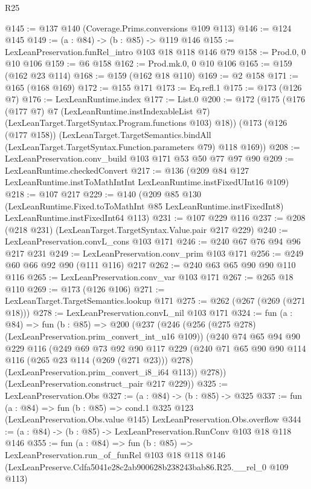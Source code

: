 \begin{lexlean}{R25}
\begin{coremodule}
@145 := @137 @140 (Coverage.Prims.conversions @109 @113)
@146 := @124 @145
@149 := (a : @84) -> (b : @85) -> @119 @146
@155 := LexLeanPreservation.funRel_intro @103 @18 @118 @146 @79
@158 := Prod.{0, 0} @10 @106
@159 := @6 @158
@162 := Prod.mk.{0, 0} @10 @106
@165 := @159 (@162 @23 @114)
@168 := @159 (@162 @18 @110)
@169 := @2 @158
@171 := @165 (@168 @169)
@172 := @155 @171
@173 := Eq.refl.{1}
@175 := @173 (@126 @7)
@176 := LexLeanRuntime.index
@177 := List.{0}
@200 := @172
    (@175
      (@176
        (@177 @7)
        @7
        (LexLeanRuntime.instIndexableList @7)
        (LexLeanTarget.TargetSyntax.Program.functions @103)
        @18))
    (@173
      (@126 (@177 @158))
      (LexLeanTarget.TargetSemantics.bindAll
        (LexLeanTarget.TargetSyntax.Function.parameters @79)
        @118
        @169))
@208 := LexLeanPreservation.conv_build @103 @171 @53 @50 @77 @97 @90
@209 := LexLeanRuntime.checkedConvert
@217 := @136 (@209 @84 @127 LexLeanRuntime.instToMathIntInt LexLeanRuntime.instFixedUInt16 @109)
@218 := @107 @217
@229 := @140
    (@209
      @85
      @130
      (LexLeanRuntime.Fixed.toToMathInt @85 LexLeanRuntime.instFixedInt8)
      LexLeanRuntime.instFixedInt64
      @113)
@231 := @107 @229 @116
@237 := @208 (@218 @231) (LexLeanTarget.TargetSyntax.Value.pair @217 @229)
@240 := LexLeanPreservation.convL_cons @103 @171
@246 := @240 @67 @76 @94 @96 @217 @231
@249 := LexLeanPreservation.conv_prim @103 @171
@256 := @249 @60 @66 @92 @90 (@111 @116) @217
@262 := @240 @63 @65 @90 @90 @110 @116
@265 := LexLeanPreservation.conv_var @103 @171
@267 := @265 @18 @110
@269 := @173 (@126 @106)
@271 := LexLeanTarget.TargetSemantics.lookup @171
@275 := @262 (@267 (@269 (@271 @18)))
@278 := LexLeanPreservation.convL_nil @103 @171
@324 := fun (a : @84) =>
  fun (b : @85) =>
  @200
    (@237
      (@246
        (@256 (@275 @278) (LexLeanPreservation.prim_convert_int_u16 @109))
        (@240
          @74
          @65
          @94
          @90
          @229
          @116
          (@249
            @69
            @73
            @92
            @90
            @117
            @229
            (@240 @71 @65 @90 @90 @114 @116 (@265 @23 @114 (@269 (@271 @23))) @278)
            (LexLeanPreservation.prim_convert_i8_i64 @113))
          @278))
      (LexLeanPreservation.construct_pair @217 @229))
@325 := LexLeanPreservation.Obs
@327 := (a : @84) -> (b : @85) -> @325
@337 := fun (a : @84) =>
  fun (b : @85) =>
  cond.{1} @325 @123 (LexLeanPreservation.Obs.value @145) LexLeanPreservation.Obs.overflow
@344 := (a : @84) -> (b : @85) -> LexLeanPreservation.RunConv @103 @18 @118 @146
@355 := fun (a : @84) =>
  fun (b : @85) =>
  LexLeanPreservation.run_of_funRel
    @103
    @18
    @118
    @146
    (LexLeanPreserve.Cdfa5041e28c2ab900628b238243bab86.R25.__rel_0 @109 @113)
\end{coremodule}
\end{lexlean}
